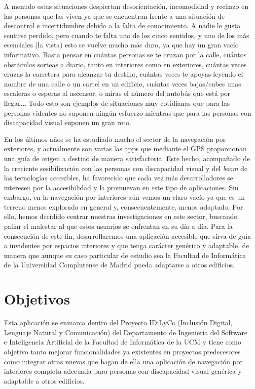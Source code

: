 A menudo estas situaciones despiertan desorientación, incomodidad y rechazo en las personas que las viven ya que se encuentran frente a una situación de descontrol e incertidumbre debido a la falta de conocimiento. A nadie le gusta sentirse perdido, pero cuando te falta uno de los cinco sentidos, y uno de los más esenciales (la vista) esto se vuelve mucho más duro, ya que hay un gran vacío informativo. Basta pensar en cuántas personas se te cruzan por la calle, cuántos obstáculos sorteas a diario, tanto en interiores como en exteriores, cuántas veces cruzas la carretera para alcanzar tu destino, cuántas veces te apoyas leyendo el nombre de una calle o un cartel en un edificio, cuántas veces bajas/subes unas escaleras o esperas al ascensor, o miras el número del autobús que está por llegar... Todo esto son ejemplos de situaciones muy cotidianas que para las personas videntes no suponen ningún esfuerzo mientras que para las personas con discapacidad visual suponen un gran reto. 

En los últimos años se ha estudiado mucho el sector de la navegación por exteriores, y actualmente son varias las apps que mediante el GPS proporcionan una guía de origen a destino de manera satisfactoria. Este hecho, acompañado de la creciente sesibilización con las personas con discapacidad visual y del \textit{boom} de las tecnologías accesibles, ha favorecido que cada vez más desarrolladores se interesen por la accesibilidad y la promuevan en este tipo de aplicaciones. Sin embargo, en la navegación por interiores aún vemos un claro vacío ya que es un terreno menos explorado en general y, consecuentemente, menos adaptado. Por ello, hemos decidido centrar nuestras investigaciones en este sector, buscando paliar el malestar al que estos usuarios se enfrentan en su día a día. Para la consecución de este fin, desarrollaremos una aplicación accesible que sirva de guía a invidentes por espacios interiores y que tenga carácter genérico y adaptable, de manera que aunque su caso particular de estudio sea la Facultad de Informática de la Universidad Complutense de Madrid pueda adaptarse a otros edificios. 


\section{Objetivos}

Esta aplicación se enmarca dentro del Proyecto IDiLyCo (Inclusión Digital, Lenguaje Natural y Comunicación) del Departamento de
Ingeniería del Software e Inteligencia Artificial de la Facultad de Informática de la UCM y tiene
como objetivo tanto mejorar funcionalidades ya existentes en proyectos predecesores como integrar otras nuevas que hagan de ella una aplicación de navegación por interiores completa adecuada para personas con discapacidad visual genérica y adaptable a otros edificios.

